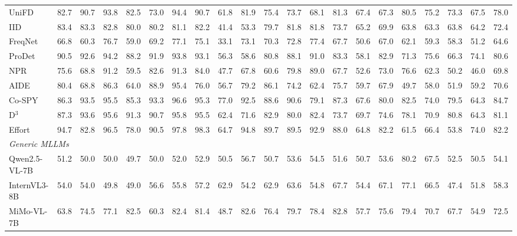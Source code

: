 \documentclass[10pt,twocolumn,letterpaper]{article}
\begin{document}
\begin{table}[t]
{\begin{tabular}{@{}l@{\hspace{2pt}} c | *{6}{c} | *{6}{c} | *{6}{c} | @{\hspace{3pt}}c@{}}
UniFD~\cite{univfd}      & 82.7 & 90.7 & 93.8 & 82.5 & 73.0 & 94.4 & 90.7 & 61.8 & 81.9 & 75.4 & 73.7 & 68.1 & 81.3 & 67.4 & 67.3 & 80.5 & 75.2 & 73.3 & 67.5 & 78.0 \\
IID~\cite{iid}           & 83.4 & 83.3 & 82.8 & 80.0 & 80.2 & 81.1 & 82.2 & 41.4 & 53.3 & 79.7 & 81.8 & 81.8 & 73.7 & 65.2 & 69.9 & 63.8 & 63.3 & 63.8 & 64.2 & 72.4 \\
FreqNet~\cite{freqblender} & 66.8 & 60.3 & 76.7 & 59.0 & 69.2 & 77.1 & 75.1 & 33.1 & 73.1 & 70.3 & 72.8 & 77.4 & 67.7 & 50.6 & 67.0 & 62.1 & 59.3 & 58.3 & 51.2 & 64.6 \\
ProDet~\cite{prodet}     & 90.5 & 92.6 & 94.2 & 88.2 & 91.9 & 93.8 & 93.1 & 56.3 & 58.6 & 80.8 & 88.1 & 91.0 & 83.3 & 58.1 & 82.9 & 71.3 & 75.6 & 66.3 & 74.1 & 80.6 \\
NPR~\cite{npr}           & 75.6 & 68.8 & 91.2 & 59.5 & 82.6 & 91.3 & 84.0 & 47.7 & 67.8 & 60.6 & 79.8 & 89.0 & 67.7 & 52.6 & 73.0 & 76.6 & 62.3 & 50.2 & 46.0 & 69.8 \\
AIDE~\cite{aide}         & 80.4 & 68.8 & 86.3 & 64.0 & 88.9 & 95.4 & 76.0 & 56.7 & 79.2 & 86.1 & 74.2 & 62.4 & 75.7 & 59.7 & 67.9 & 49.7 & 58.0 & 51.9 & 59.2 & 70.6 \\
Co-SPY~\cite{cospy}      & 86.3 & 93.5 & 95.5 & 85.3 & 93.3 & 96.6 & 95.3 & 77.0 & 92.5 & 88.6 & 90.6 & 79.1 & 87.3 & 67.6 & 80.0 & 82.5 & 74.0 & 79.5 & 64.3 & 84.7 \\
D$^3$~\cite{d3}          & 87.3 & 93.6 & 95.6 & 91.3 & 90.7 & 95.8 & 95.5 & 62.4 & 71.6 & 82.9 & 80.0 & 82.4 & 73.7 & 69.7 & 74.6 & 78.1 & 70.9 & 80.8 & 64.3 & 81.1 \\
Effort~\cite{effort}     & 94.7 & 82.8 & 96.5 & 78.0 & 90.5 & 97.8 & 98.3 & 64.7 & 94.8 & 89.7 & 89.5 & 92.9 & 88.0 & 64.8 & 82.2 & 61.5 & 66.4 & 53.8 & 74.0 & 82.2 \\
\midrule
\multicolumn{21}{l}{\emph{Generic MLLMs}} \\
Qwen2.5-VL-7B~\cite{qwenvl}        & 51.2 & 50.0 & 50.0 & 49.7 & 50.0 & 52.0 & 52.9 & 50.5 & 56.7 & 50.7 & 53.6 & 54.5 & 51.6 & 50.7 & 53.6 & 80.2 & 67.5 & 52.5 & 50.5 & 54.1 \\
InternVL3-8B~\cite{internvl3}      & 54.0 & 54.0 & 49.8 & 49.0 & 56.6 & 55.8 & 57.2 & 62.9 & 54.2 & 62.9 & 63.6 & 54.8 & 67.7 & 54.4 & 67.1 & 77.1 & 66.5 & 47.4 & 51.8 & 58.3 \\
MiMo-VL-7B~\cite{mimo}             & 63.8 & 74.5 & 77.1 & 82.5 & 60.3 & 82.4 & 81.4 & 48.7 & 82.6 & 76.4 & 79.7 & 78.4 & 82.8 & 57.7 & 75.6 & 79.4 & 70.7 & 67.7 & 54.9 & 72.5 \\

\end{tabular}}
\end{table}
\end{document}
